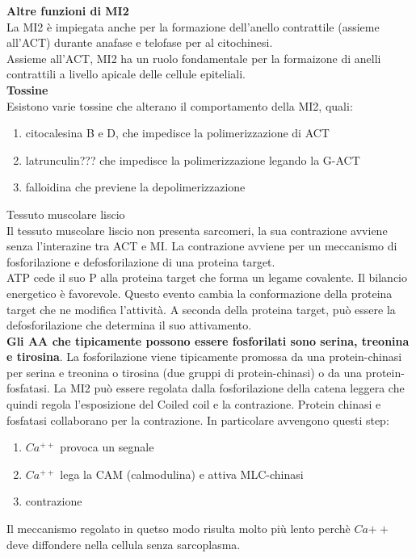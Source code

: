                 \textbf{Altre funzioni di MI2}\\
                    La MI2 è impiegata anche per la formazione dell'anello contrattile (assieme all'ACT) durante anafase e telofase per al citochinesi. \\
                    Assieme all'ACT, MI2 ha un ruolo fondamentale per la formaizone di anelli contrattili a livello apicale delle cellule epiteliali.\\
                
                \textbf{Tossine}\\
                    Esistono varie tossine che alterano il comportamento della MI2, quali:
                    \begin{enumerate}
                        \item citocalesina B e D, che impedisce la polimerizzazione di ACT
                        \item latrunculin??? che impedisce la polimerizzazione legando la G-ACT
                        \item falloidina che previene la depolimerizzazione
                    \end{enumerate}
                
            \textbf{}{Tessuto muscolare liscio}\\
                Il tessuto muscolare liscio non presenta sarcomeri, la sua contrazione avviene senza l'interazine tra ACT e MI.
                La contrazione avviene per un meccanismo di fosforilazione e defosforilazione di una proteina target.\\
                ATP cede il suo P alla proteina target che forma un legame covalente. Il bilancio energetico è favorevole. Questo evento cambia la conformazione della proteina target che ne modifica l'attività.
                A seconda della proteina target, può essere la defosforilazione che determina il suo attivamento. \\
                \textbf{Gli AA che tipicamente possono essere fosforilati sono serina, treonina e tirosina}. La fosforilazione viene tipicamente promossa da una protein-chinasi per serina e treonina o tirosina (due gruppi di protein-chinasi) o da una protein-fosfatasi.
                La MI2 può essere regolata dalla fosforilazione della catena leggera che quindi regola l'esposizione del Coiled coil e la contrazione. Protein chinasi e fosfatasi collaborano per la contrazione. In particolare avvengono questi step:
                \begin{enumerate}
                    \item $Ca^{++}$ provoca un segnale
                    \item $Ca^{++}$ lega la CAM (calmodulina) e attiva MLC-chinasi
                    \item contrazione
                \end{enumerate}
                Il meccanismo regolato in quetso modo risulta molto più lento perchè $Ca{++}$ deve diffondere nella cellula senza sarcoplasma.
        
